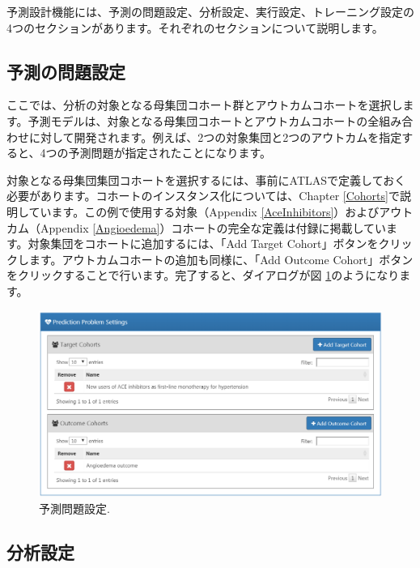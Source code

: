 \documentclass[
  11pt]{book}
\theoremstyle{definition}
\theoremstyle{definition}
\theoremstyle{definition}
\theoremstyle{definition}
\theoremstyle{remark}
\begin{document}
予測設計機能には、予測の問題設定、分析設定、実行設定、トレーニング設定の4つのセクションがあります。それぞれのセクションについて説明します。

\subsection{予測の問題設定}\label{ux4e88ux6e2cux306eux554fux984cux8a2dux5b9a}

ここでは、分析の対象となる母集団コホート群とアウトカムコホートを選択します。予測モデルは、対象となる母集団コホートとアウトカムコホートの全組み合わせに対して開発されます。例えば、2つの対象集団と2つのアウトカムを指定すると、4つの予測問題が指定されたことになります。

対象となる母集団集団コホートを選択するには、事前にATLASで定義しておく必要があります。コホートのインスタンス化については、Chapter \ref{Cohorts}で説明しています。この例で使用する対象（Appendix \ref{AceInhibitors}）およびアウトカム（Appendix \ref{Angioedema}）コホートの完全な定義は付録に掲載しています。対象集団をコホートに追加するには、「Add Target Cohort」ボタンをクリックします。アウトカムコホートの追加も同様に、「Add Outcome Cohort」ボタンをクリックすることで行います。完了すると、ダイアログが図 \ref{fig:problemSettings}のようになります。

\begin{figure}

{\centering \includegraphics[width=1\linewidth]{images/PatientLevelPrediction/problemSettings} 

}

\caption{予測問題設定.}\label{fig:problemSettings}
\end{figure}

\subsection{分析設定}\label{ux5206ux6790ux8a2dux5b9a}
\end{document}
